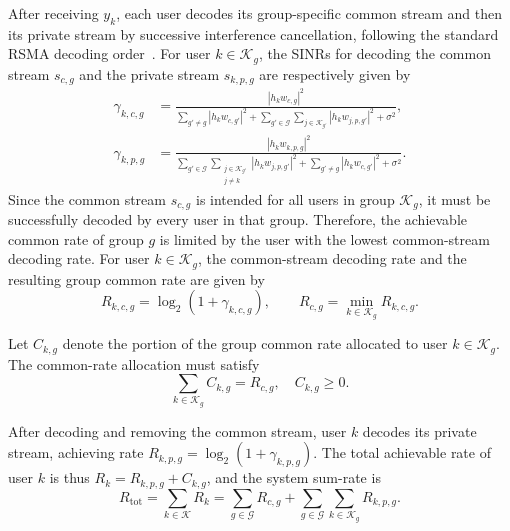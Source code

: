 \documentclass[12pt,onecolumn]{IEEEtran}
\begin{document}
After receiving $y_k$, each user decodes its group-specific common stream and then its
private stream by successive interference cancellation, following the standard RSMA
decoding order~\cite{mao2018rate,mao2022rate}.
For user $k \in \mathcal{K}_g$, the SINRs for decoding the common stream $s_{c,g}$ and the private stream $s_{k,p,g}$ are respectively given by
\begin{equation}
\begin{aligned}
    \gamma_{k,c,g}
    &=
    \frac{
        |h_k w_{c,g}|^2
    }{
        \sum_{g' \neq g}
        |h_k w_{c,g'}|^2
        \!+\!
        \sum_{g' \in \mathcal{G}}\!\sum_{j \in \mathcal{K}_{g'}}\!
        |h_k w_{j,p,g'}|^2
        \!+\!
        \sigma^2
    },
    \\[2mm]
    \gamma_{k,p,g}
    &=
    \frac{
        |h_k w_{k,p,g}|^2
    }{
        \sum_{g' \in \mathcal{G}}\!\sum_{\substack{j \in \mathcal{K}_{g'} \\ j \neq k}}\!
        |h_k w_{j,p,g'}|^2
        \!+\!
        \sum_{g' \neq g}
        |h_k w_{c,g'}|^2
        \!+\!
        \sigma^2
    }.
\end{aligned}
\end{equation}
Since the common stream $s_{c,g}$ is intended for all users in group $\mathcal{K}_g$, it must be successfully decoded by every user in that group. 
Therefore, the achievable common rate of group $g$ is limited by the user with the lowest common-stream decoding rate. 
For user $k \in \mathcal{K}_g$, the common-stream decoding rate and the resulting group common rate are given by
\begin{equation}
    R_{k,c,g}
    =
    \log_2\left(1 + \gamma_{k,c,g}\right),
    \qquad
    R_{c,g}
    =
    \min_{k \in \mathcal{K}_g} R_{k,c,g}.
\end{equation}

Let $C_{k,g}$ denote the portion of the group common rate allocated to user $k \in \mathcal{K}_g$. 
The common-rate allocation must satisfy
\begin{equation}
    \sum_{k \in \mathcal{K}_g} C_{k,g}
    =
    R_{c,g},
    \quad
    C_{k,g} \geq 0.
\end{equation}

After decoding and removing the common stream, user $k$ decodes its private stream, achieving rate $R_{k,p,g} = \log_2(1 + \gamma_{k,p,g})$.
The total achievable rate of user $k$ is thus $R_k = R_{k,p,g} + C_{k,g}$, and the system sum-rate is
\begin{equation}
    R_{\mathrm{tot}}
    =
    \sum_{k \in \mathcal{K}}
    R_k
    =
    \sum_{g \in \mathcal{G}} R_{c,g}
    +
    \sum_{g \in \mathcal{G}}\sum_{k \in \mathcal{K}_g} R_{k,p,g}.
\end{equation}
\end{document}
